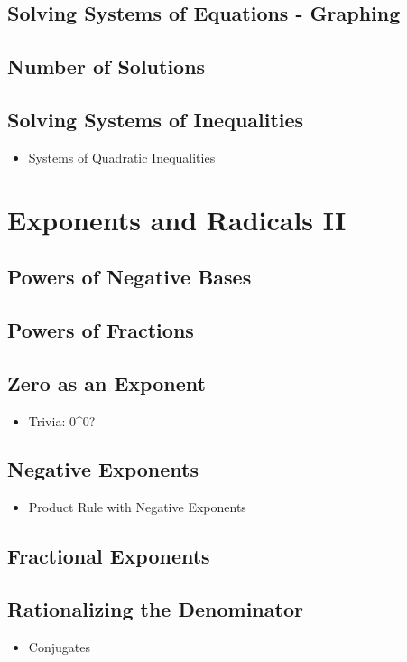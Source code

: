 \documentclass[11pt]{article}
\begin{document}
\subsection{Solving Systems of Equations - Graphing}
\subsection{Number of Solutions}
\subsection{Solving Systems of Inequalities}
\begin{itemize}
    \item Systems of Quadratic Inequalities
\end{itemize}

\setcounter{section}{7}
\section{Exponents and Radicals II}
\subsection{Powers of Negative Bases}
\subsection{Powers of Fractions}
\subsection{Zero as an Exponent}
\begin{itemize}
    \item Trivia: 0\textasciicircum{}0?
\end{itemize}
\subsection{Negative Exponents}
\begin{itemize}
    \item Product Rule with Negative Exponents
\end{itemize}
\subsection{Fractional Exponents}
\subsection{Rationalizing the Denominator}
\begin{itemize}
    \item Conjugates
\end{itemize}
\end{document}
